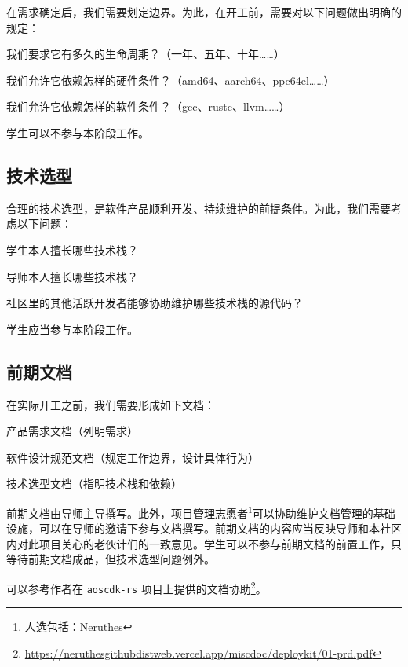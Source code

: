 \documentclass[a4paper,11pt]{article}
\newcommand{\smallnote}[1]{{\sffamily\footnotesize#1}}
\begin{document}
在需求确定后，我们需要划定边界。为此，在开工前，需要对以下问题做出明确的规定：

\begin{compactitem}
	\item 我们要求它有多久的生命周期？\smallnote{（一年、五年、十年……）}
	\item 我们允许它依赖怎样的硬件条件？\smallnote{（amd64、aarch64、ppc64el……）}
	\item 我们允许它依赖怎样的软件条件？\smallnote{（gcc、rustc、llvm……）}
\end{compactitem}

学生可以不参与本阶段工作。

\subsection{技术选型}

合理的技术选型，是软件产品顺利开发、持续维护的前提条件。为此，我们需要考虑以下问题：

\begin{compactitem}
	\item 学生本人擅长哪些技术栈？
	\item 导师本人擅长哪些技术栈？
	\item 社区里的其他活跃开发者能够协助维护哪些技术栈的源代码？
\end{compactitem}

学生应当参与本阶段工作。

\subsection{前期文档}

在实际开工之前，我们需要形成如下文档：

\begin{compactitem}
	\item 产品需求文档\smallnote{（列明需求）}
	\item 软件设计规范文档\smallnote{（规定工作边界，设计具体行为）}
	\item 技术选型文档\smallnote{（指明技术栈和依赖）}
\end{compactitem}

前期文档由导师主导撰写。此外，项目管理志愿者\footnote{人选包括：Neruthes}可以协助维护文档管理的基础设施，可以在导师的邀请下参与文档撰写。前期文档的内容应当反映导师和本社区内对此项目关心的老伙计们的一致意见。学生可以不参与前期文档的前置工作，只等待前期文档成品，但技术选型问题例外。

可以参考作者在 \texttt{aoscdk-rs} 项目上提供的文档协助\footnote{\href{https://neruthesgithubdistweb.vercel.app/miscdoc/deploykit/01-prd.pdf}{https://neruthesgithubdistweb.vercel.app/miscdoc/deploykit/01-prd.pdf}}。
\end{document}
